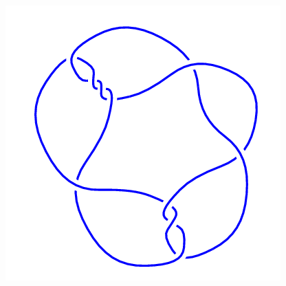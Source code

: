 \begin{figure}[H]
\begin{minipage}[b]{.18\linewidth}
	\end{minipage}
	\begin{minipage}[b]{.18\linewidth}
		\centering
		\includegraphics[width=\linewidth]{../data/10_11.png}
	\end{minipage}
\end{figure}

